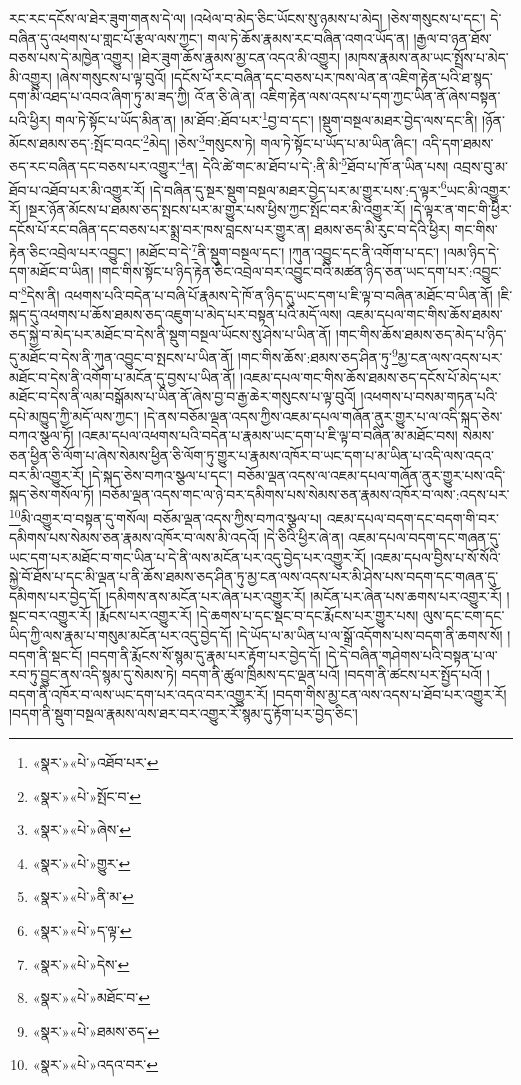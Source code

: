 རང་རང་དངོས་ལ་ཐེར་ཟུག་གནས་དེ་ལ། །འཕེལ་བ་མེད་ཅིང་ཡོངས་སུ་ཉམས་པ་མེད། །ཅེས་གསུངས་པ་དང་། དེ་བཞིན་དུ་འཕགས་པ་གླང་པོ་རྩལ་ལས་ཀྱང་། གལ་ཏེ་ཆོས་རྣམས་རང་བཞིན་འགའ་ཡོད་ན། །རྒྱལ་བ་ཉན་ཐོས་བཅས་པས་དེ་མཁྱེན་འགྱུར། །ཐེར་ཟུག་ཆོས་རྣམས་མྱ་ངན་འདའ་མི་འགྱུར། །མཁས་རྣམས་ནམ་ཡང་སྤྲོས་པ་མེད་མི་འགྱུར། །ཞེས་གསུངས་པ་ལྟ་བུའོ། །དངོས་པོ་རང་བཞིན་དང་བཅས་པར་ཁས་ལེན་ན་འཇིག་རྟེན་པའི་ཐ་སྙད་དག་མི་འཐད་པ་འབའ་ཞིག་ཏུ་མ་ཟད་ཀྱི། འོ་ན་ཅི་ཞེ་ན། འཇིག་རྟེན་ལས་འདས་པ་དག་ཀྱང་ཡིན་ནོ་ཞེས་བསྟན་པའི་ཕྱིར། གལ་ཏེ་སྟོང་པ་ཡོད་མིན་ན། །མ་ཐོབ་:ཐོབ་པར་\footnote{«སྣར་»«པེ་»འཐོབ་པར་}བྱ་བ་དང་། །སྡུག་བསྔལ་མཐར་བྱེད་ལས་དང་ནི། །ཉོན་མོངས་ཐམས་ཅད་:སྤོང་བའང་\footnote{«སྣར་»«པེ་»སྤོང་བ་}མེད། །ཅེས་\footnote{«སྣར་»«པེ་»ཞེས་}གསུངས་ཏེ། གལ་ཏེ་སྟོང་པ་ཡོད་པ་མ་ཡིན་ཞིང་། འདི་དག་ཐམས་ཅད་རང་བཞིན་དང་བཅས་པར་འགྱུར་\footnote{«སྣར་»«པེ་»གྱུར་}ན། དེའི་ཚེ་གང་མ་ཐོབ་པ་དེ་:ནི་མི་\footnote{«སྣར་»«པེ་»ནི་མ་}ཐོབ་པ་ཁོ་ན་ཡིན་པས། འབྲས་བུ་མ་ཐོབ་པ་འཐོབ་པར་མི་འགྱུར་རོ། །དེ་བཞིན་དུ་སྔར་སྡུག་བསྔལ་མཐར་བྱེད་པར་མ་གྱུར་པས་:ད་ལྟར་\footnote{«སྣར་»«པེ་»ད་ལྟ་}ཡང་མི་འགྱུར་རོ། །སྔར་ཉོན་མོངས་པ་ཐམས་ཅད་སྤངས་པར་མ་གྱུར་པས་ཕྱིས་ཀྱང་སྤོང་བར་མི་འགྱུར་རོ། །དེ་ལྟར་ན་གང་གི་ཕྱིར་དངོས་པོ་རང་བཞིན་དང་བཅས་པར་སྨྲ་བར་ཁས་བླངས་པར་གྱུར་ན། ཐམས་ཅད་མི་རུང་བ་དེའི་ཕྱིར། གང་གིས་རྟེན་ཅིང་འབྲེལ་པར་འབྱུང་། །མཐོང་བ་དེ་\footnote{«སྣར་»«པེ་»དེས་}ནི་སྡུག་བསྔལ་དང་། །ཀུན་འབྱུང་དང་ནི་འགོག་པ་དང་། །ལམ་ཉིད་དེ་དག་མཐོང་བ་ཡིན། །གང་གིས་སྟོང་པ་ཉིད་རྟེན་ཅིང་འབྲེལ་བར་འབྱུང་བའི་མཚན་ཉིད་ཅན་ཡང་དག་པར་:འབྱུང་བ་\footnote{«སྣར་»«པེ་»མཐོང་བ་}དེས་ནི། འཕགས་པའི་བདེན་པ་བཞི་པོ་རྣམས་དེ་ཁོ་ན་ཉིད་དུ་ཡང་དག་པ་ཇི་ལྟ་བ་བཞིན་མཐོང་བ་ཡིན་ནོ། །ཇི་སྐད་དུ་འཕགས་པ་ཆོས་ཐམས་ཅད་འཇུག་པ་མེད་པར་བསྟན་པའི་མདོ་ལས། འཇམ་དཔལ་གང་གིས་ཆོས་ཐམས་ཅད་སྐྱེ་བ་མེད་པར་མཐོང་བ་དེས་ནི་སྡུག་བསྔལ་ཡོངས་སུ་ཤེས་པ་ཡིན་ནོ། །གང་གིས་ཆོས་ཐམས་ཅད་མེད་པ་ཉིད་དུ་མཐོང་བ་དེས་ནི་ཀུན་འབྱུང་བ་སྤངས་པ་ཡིན་ནོ། །གང་གིས་ཆོས་:ཐམས་ཅད་ཤིན་ཏུ་\footnote{«སྣར་»«པེ་»ཐམས་ཅད་}མྱ་ངན་ལས་འདས་པར་མཐོང་བ་དེས་ནི་འགོག་པ་མངོན་དུ་བྱས་པ་ཡིན་ནོ། །འཇམ་དཔལ་གང་གིས་ཆོས་ཐམས་ཅད་དངོས་པོ་མེད་པར་མཐོང་བ་དེས་ནི་ལམ་བསྒོམས་པ་ཡིན་ནོ་ཞེས་བྱ་བ་རྒྱ་ཆེར་གསུངས་པ་ལྟ་བུའོ། །འཕགས་པ་བསམ་གཏན་པའི་དཔེ་མཁྱུད་ཀྱི་མདོ་ལས་ཀྱང་། །དེ་ནས་བཅོམ་ལྡན་འདས་ཀྱིས་འཇམ་དཔལ་གཞོན་ནུར་གྱུར་པ་ལ་འདི་སྐད་ཅེས་བཀའ་སྩལ་ཏོ། །འཇམ་དཔལ་འཕགས་པའི་བདེན་པ་རྣམས་ཡང་དག་པ་ཇི་ལྟ་བ་བཞིན་མ་མཐོང་བས། སེམས་ཅན་ཕྱིན་ཅི་ལོག་པ་ཞེས་སེམས་ཕྱིན་ཅི་ལོག་ཏུ་གྱུར་པ་རྣམས་འཁོར་བ་ཡང་དག་པ་མ་ཡིན་པ་འདི་ལས་འདའ་བར་མི་འགྱུར་རོ། །དེ་སྐད་ཅེས་བཀའ་སྩལ་པ་དང་། བཅོམ་ལྡན་འདས་ལ་འཇམ་དཔལ་གཞོན་ནུར་གྱུར་པས་འདི་སྐད་ཅེས་གསོལ་ཏོ། །བཅོམ་ལྡན་འདས་གང་ལ་ཉེ་བར་དམིགས་པས་སེམས་ཅན་རྣམས་འཁོར་བ་ལས་:འདས་པར་\footnote{«སྣར་»«པེ་»འདའ་བར་}མི་འགྱུར་བ་བསྟན་དུ་གསོལ། བཅོམ་ལྡན་འདས་ཀྱིས་བཀའ་སྩལ་པ། འཇམ་དཔལ་བདག་དང་བདག་གི་བར་དམིགས་པས་སེམས་ཅན་རྣམས་འཁོར་བ་ལས་མི་འདའོ། །དེ་ཅིའི་ཕྱིར་ཞེ་ན། འཇམ་དཔལ་བདག་དང་གཞན་དུ་ཡང་དག་པར་མཐོང་བ་གང་ཡིན་པ་དེ་ནི་ལས་མངོན་པར་འདུ་བྱེད་པར་འགྱུར་རོ། །འཇམ་དཔལ་བྱིས་པ་སོ་སོའི་སྐྱེ་བོ་ཐོས་པ་དང་མི་ལྡན་པ་ནི་ཆོས་ཐམས་ཅད་ཤིན་ཏུ་མྱ་ངན་ལས་འདས་པར་མི་ཤེས་པས་བདག་དང་གཞན་དུ་དམིགས་པར་བྱེད་དོ། །དམིགས་ནས་མངོན་པར་ཞེན་པར་འགྱུར་རོ། །མངོན་པར་ཞེན་པས་ཆགས་པར་འགྱུར་རོ། །སྡང་བར་འགྱུར་རོ། །རྨོངས་པར་འགྱུར་རོ། །དེ་ཆགས་པ་དང་སྡང་བ་དང་རྨོངས་པར་གྱུར་པས། ལུས་དང་ངག་དང་ཡིད་ཀྱི་ལས་རྣམ་པ་གསུམ་མངོན་པར་འདུ་བྱེད་དོ། །དེ་ཡོད་པ་མ་ཡིན་པ་ལ་སྒྲོ་འདོགས་པས་བདག་ནི་ཆགས་སོ། །བདག་ནི་སྡང་ངོ། །བདག་ནི་རྨོངས་སོ་སྙམ་དུ་རྣམ་པར་རྟོག་པར་བྱེད་དོ། །དེ་དེ་བཞིན་གཤེགས་པའི་བསྟན་པ་ལ་རབ་ཏུ་བྱུང་ནས་འདི་སྙམ་དུ་སེམས་ཏེ། བདག་ནི་ཚུལ་ཁྲིམས་དང་ལྡན་པའོ། །བདག་ནི་ཚངས་པར་སྤྱོད་པའོ། །བདག་ནི་འཁོར་བ་ལས་ཡང་དག་པར་འདའ་བར་འགྱུར་རོ། །བདག་གིས་མྱ་ངན་ལས་འདས་པ་ཐོབ་པར་འགྱུར་རོ། །བདག་ནི་སྡུག་བསྔལ་རྣམས་ལས་ཐར་བར་འགྱུར་རོ་སྙམ་དུ་རྟོག་པར་བྱེད་ཅིང་། 